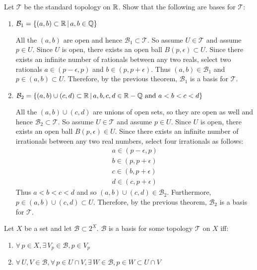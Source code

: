 \documentclass[letterpaper,12pt,fleqn]{article}
\newcommand{\T}{\mathscr{T}}
\newcommand{\B}{\mathcal{B}}
\newcommand{\e}{\epsilon}
\begin{document}
\begin{example}[Exercise 3.2]
  Let \(\T\) be the standard topology on \(\mathbb{R}\).  Show that the following are bases for \(\T\):
  \begin{enumerate}
  \item \(\B_1=\setb{(a,b)\subset\R}{a,b\in\Q}\)

    All the \((a,b)\) are open and hence \(\B_1\subset\T\).  So assume \(U\in\T\) and assume \(p\in U\).  Since
    \(U\) is open, there exists an open ball \(B(p,\e)\subset U\).  Since there exists an infinite number of
    rationals between any two reals, select two rationals \(a\in(p-\e,p)\) and \(b\in(p,p+\e)\).  Thus
    \((a,b)\in\B_1\) and \(p\in(a,b)\subset U\).  Therefore, by the previous theorem, \(\B_1\) is a basis for
    \(\T\).

  \item \(\B_2=\setb{(a,b)\cup(c,d)\subset\R}{a,b,c,d\in\R-\Q\ \text{and}\ a<b<c<d}\)

    All the \((a,b)\cup(c,d)\) are unions of open sets, so they are open as well and hence \(\B_2\subset\T\).  So
    assume \(U\in\T\) and assume \(p\in U\).  Since \(U\) is open, there exists an open ball \(B(p,\e)\in U\).
    Since there exists an infinite number of irrationals between any two real numbers, select four irrationals as
    follows:
    \begin{gather*}
      a\in(p-\e,p) \\
      b\in(p,p+\e) \\
      c\in(b,p+\e) \\
      d\in(c,p+\e)
    \end{gather*}
    Thus \(a<b<c<d\) and so \((a,b)\cup(c,d)\in\B_2\). Furthermore, \(p\in(a,b)\cup(c,d)\subset U\).  Therefore, by
    the previous theorem, \(\B_2\) is a basis for \(\T\).
  \end{enumerate}
\end{example}

\begin{theorem}[3.3]    
  Let \(X\) be a set and let \(\B\subset2^X\).  \(\B\) is a basis for some topology \(\T\) on \(X\) iff:
  \begin{enumerate}
  \item \(\forall\,p\in X,\exists\,V_p\in\B,p\in V_p\)
  \item \(\forall\,U,V\in\B,\forall\,p\in U\cap V,\exists\,W\in\B,p\in W\subset U\cap V\)
  \end{enumerate}
\end{theorem}
\end{document}
